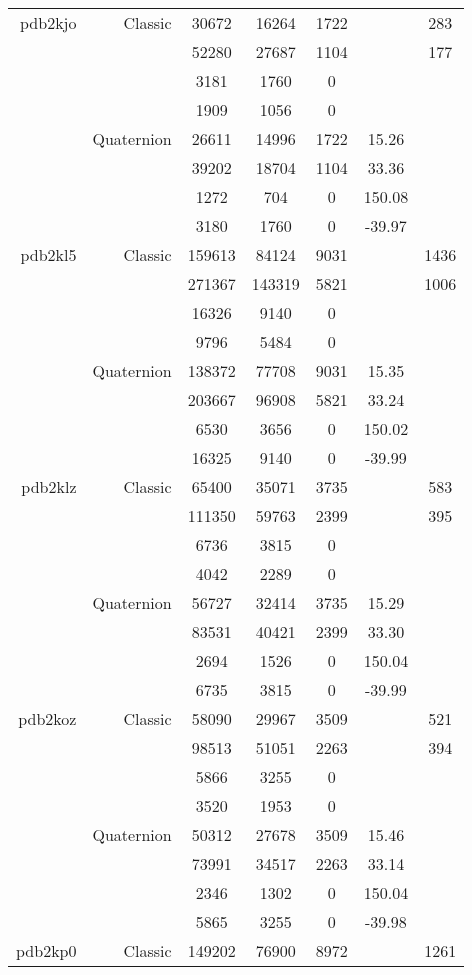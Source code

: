 \begin{xltabular}{\textwidth}{r|rcccSc}
pdb2kjo & Classic & 30672 & 16264 & 1722 & & 283 \\
& & 52280 & 27687 & 1104 & & 177 \\
& & 3181 & 1760 & 0 & & \\
& & 1909 & 1056 & 0 & & \\
& Quaternion & 26611 & 14996 & 1722 & 15.26 & \\
& & 39202 & 18704 & 1104 & 33.36 & \\
& & 1272 & 704 & 0 & 150.08 & \\
& & 3180 & 1760 & 0 & -39.97 & \\ \addlinespace
pdb2kl5 & Classic & 159613 & 84124 & 9031 & & 1436 \\
& & 271367 & 143319 & 5821 & & 1006 \\
& & 16326 & 9140 & 0 & & \\
& & 9796 & 5484 & 0 & & \\
& Quaternion & 138372 & 77708 & 9031 & 15.35 & \\
& & 203667 & 96908 & 5821 & 33.24 & \\
& & 6530 & 3656 & 0 & 150.02 & \\
& & 16325 & 9140 & 0 & -39.99 & \\ \addlinespace
pdb2klz & Classic & 65400 & 35071 & 3735 & & 583 \\
& & 111350 & 59763 & 2399 & & 395 \\
& & 6736 & 3815 & 0 & & \\
& & 4042 & 2289 & 0 & & \\
& Quaternion & 56727 & 32414 & 3735 & 15.29 & \\
& & 83531 & 40421 & 2399 & 33.30 & \\
& & 2694 & 1526 & 0 & 150.04 & \\
& & 6735 & 3815 & 0 & -39.99 & \\ \addlinespace
pdb2koz & Classic & 58090 & 29967 & 3509 & & 521 \\
& & 98513 & 51051 & 2263 & & 394 \\
& & 5866 & 3255 & 0 & & \\
& & 3520 & 1953 & 0 & & \\
& Quaternion & 50312 & 27678 & 3509 & 15.46 & \\
& & 73991 & 34517 & 2263 & 33.14 & \\
& & 2346 & 1302 & 0 & 150.04 & \\
& & 5865 & 3255 & 0 & -39.98 & \\ \addlinespace
pdb2kp0 & Classic & 149202 & 76900 & 8972 & & 1261 \\

\end{xltabular}
